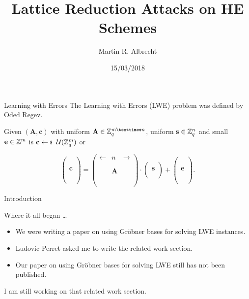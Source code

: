 \documentclass[presentation,smaller]{beamer}
\author{Martin R. Albrecht}
\date{15/03/2018}
\title{Lattice Reduction Attacks on HE Schemes}
\renewcommand{\vec}[1]{\ensuremath{\mathbf{#1}}\xspace}
\begin{document}
\maketitle

\begin{frame}[label={sec:org8591b3a}]{Learning with Errors}
The Learning with Errors (LWE) problem was deﬁned by Oded Regev.

Given \((\vec{A},\vec{c})\) with uniform \(\vec{A} \in \ZZ_q^{m × n}\), uniform \(\vec{s} \in \ZZ_q^{n}\) and small \(\vec{e} \in \ZZ^{m}\) is \(\vec{c} \sample \mathcal{U}({\ZZ_q^{m}})\) or

\[
\left(\begin{array}{c}
\\
\\
\\ 
\vec{c} \\
\\
\\
\\
\end{array} \right) = \left(
\begin{array}{ccc}
\leftarrow & n & \rightarrow \\
\\
\\ 
& \vec{A} & \\
\\
\\
\\
\end{array} \right) \cdot \left( \begin{array}{c}
\\
\vec{s} \\
\\
\end{array} \right) + \left(
\begin{array}{c}
\\
\\
\\ 
\vec{e} \\
\\
\\
\\
\end{array} 
\right).
\]
\end{frame}


\begin{frame}[label={sec:orgd658f5a}]{Introduction}
\begin{block}{Where it all began …}
\end{block}

\begin{itemize}
\item We were writing a paper on using Gröbner bases for solving LWE instances.
\item Ludovic Perret asked me to write the related work section.
\item Our paper on using Gröbner bases for solving LWE still has not been published.
\end{itemize}


I am still working on that related work section.
\end{frame}
\end{document}
